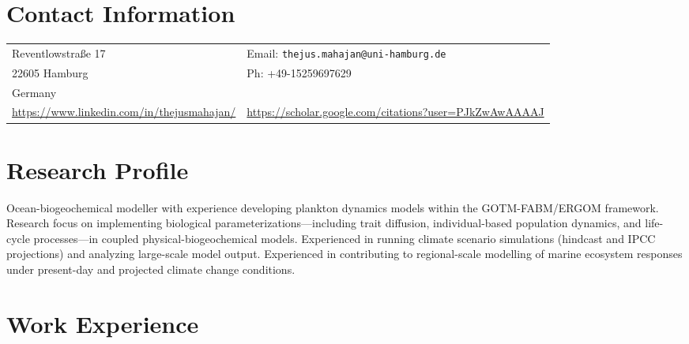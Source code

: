 \documentclass[margin,line,pifont,palatino,courier]{res}
\begin{document}

\begin{resume}

\section{\sc Contact Information}

\vspace{.02in}
\begin{tabular}{@{}p{3.75in}p{2in}}
 Reventlowstra{\ss}e 17 & Email: \verb+thejus.mahajan@uni-hamburg.de+\\
 22605 Hamburg & Ph: +49-15259697629 \\
 Germany & \\
 \url{https://www.linkedin.com/in/thejusmahajan/} & \url{https://scholar.google.com/citations?user=PJkZwAwAAAAJ}
\end{tabular}

\section{\sc Research Profile}
Ocean-biogeochemical modeller with experience developing plankton dynamics models within the GOTM-FABM/ERGOM framework. Research focus on implementing biological parameterizations---including trait diffusion, individual-based population dynamics, and life-cycle processes---in coupled physical-biogeochemical models. Experienced in running climate scenario simulations (hindcast and IPCC projections) and analyzing large-scale model output. Experienced in contributing to regional-scale modelling of marine ecosystem responses under present-day and projected climate change conditions.

\section{\sc Work Experience}


\end{resume}
\end{document}
